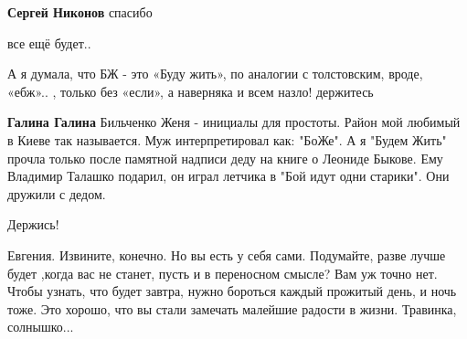 \begin{itemize}
\begin{itemize}
\textbf{Сергей Никонов} спасибо
\end{itemize}

 
все ещё будет..

 

А я думала, что БЖ - это «Буду жить», по аналогии с толстовским, вроде, «ебж»..
, только без «если», а наверняка и всем назло!  держитесь 🤍

\begin{itemize}
 
\textbf{Галина Галина} Бильченко Женя - инициалы для простоты. Район мой
любимый в Киеве так называется. Муж интерпретировал как: "БоЖе". А я "Будем
Жить" прочла только после памятной надписи деду на книге о Леониде Быкове. Ему
Владимир Талашко подарил, он играл летчика в "Бой идут одни старики". Они
дружили с дедом.
\end{itemize}

 
Держись!

 

Евгения. Извините, конечно. Но вы есть у себя сами. Подумайте, разве лучше будет
,когда вас не станет, пусть и в переносном смысле? Вам уж точно нет. Чтобы
узнать, что будет завтра, нужно бороться каждый прожитый день, и ночь тоже. Это
хорошо, что вы стали замечать малейшие радости в жизни. Травинка, солнышко... 


\end{itemize}
